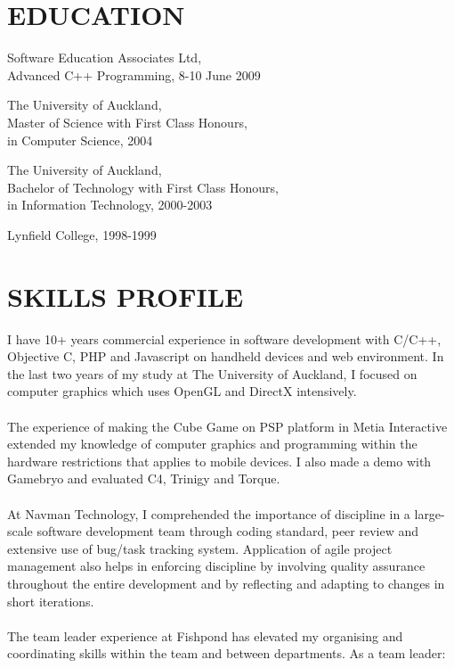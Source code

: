 \begin{resume}
\vspace{0.1in}

\section{EDUCATION}
\vspace{0.1in} 
Software Education Associates Ltd,\\
Advanced C++ Programming, 8-10 June 2009

The University of Auckland,\\
Master of Science with First Class Honours,\\
in Computer Science, 2004 
 
The University of Auckland,\\
Bachelor of Technology with First Class Honours,\\
in Information Technology, 2000-2003 
 
Lynfield College, 1998-1999 
 
\section{SKILLS PROFILE} 
\vspace{0.1in}

I have 10+ years commercial experience in software development with C/C++, Objective C, PHP and Javascript on handheld devices and web environment. In the last two years of my study at The University of Auckland, I focused on computer graphics which uses OpenGL and DirectX intensively.\\\\
The experience of making the Cube Game on PSP platform in Metia Interactive extended my knowledge of computer graphics and programming within the hardware restrictions that applies to mobile devices. I also made a demo with Gamebryo and evaluated C4, Trinigy and Torque.\\\\
At Navman Technology, I comprehended the importance of discipline in a large-scale software development team through coding standard, peer review and extensive use of bug/task tracking system. Application of agile project management also helps in enforcing discipline by involving quality assurance throughout the entire development and by reflecting and adapting to changes in short iterations.\\\\
The team leader experience at Fishpond has elevated my organising and coordinating skills within the team and between departments. As a team leader: 


\end{resume}
